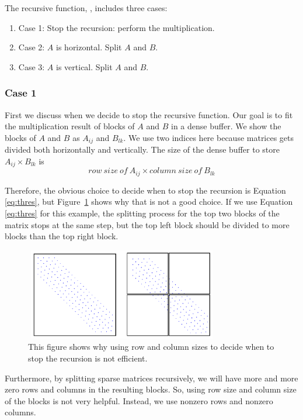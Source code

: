 The recursive function, \recmm, includes three cases:
\begin{enumerate}
 \item Case 1: Stop the recursion: perform the multiplication.
 \item Case 2: $A$ is horizontal. Split $A$ and $B$.
 \item Case 3: $A$ is vertical. Split $A$ and $B$.
\end{enumerate}

\subsubsection{Case 1}
\label{sec:case1}
First we discuss when we decide to stop the recursive function.  
Our goal is to fit the multiplication result of blocks of $A$ and $B$ in a dense buffer. We show the blocks of $A$ and $B$ as $A_{ij}$ and $B_{lk}$. We use two indices here because matrices gets divided both horizontally and vertically. The size of the dense buffer to store $A_{ij} \times B_{lk}$ is
\begin{equation}
    row\ size\ of\ A_{ij} \times column\ size\ of\ B_{lk}\label{eq:thres}
\end{equation}

Therefore, the obvious choice to decide when to stop the recursion is Equation~ \eqref{eq:thres}, but Figure~\ref{fig:thres} shows why that is not a good choice. If we use Equation~ \eqref{eq:thres} for this example, the splitting process for the top two blocks of the matrix stops at the same step, but the top left block should be divided to more blocks than the top right block.

\begin{figure}[tbh]
 \centering
 \includegraphics[width=8.5cm,height=4cm]{./figures/split3.pdf}
 \caption{This figure shows why using row and column sizes to decide when to stop the recursion is not efficient.}
 \label{fig:thres}
 \Description{}
\end{figure}

Furthermore, by splitting sparse matrices recursively, we will have more and more zero rows and columns in the resulting blocks. So, using row size and column size of the blocks is not very helpful. Instead, we use nonzero rows and nonzero columns.

